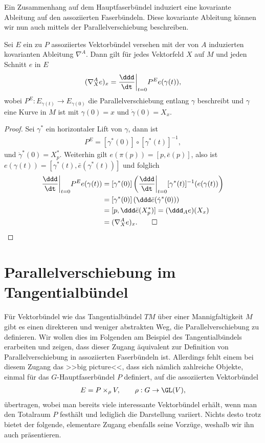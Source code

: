 \documentclass[%
	paper=a5,%
	fleqn,%
	DIV=18,%
	BCOR=0mm,
	fontsize=11pt,
	titlepage=false,%
	bibliography=totoc,
	DIV=18,%
	twoside=true,
	pdftitle=Riemannsche Geometrie,
	pdfauthor=Uwe Semmelmann,
	numbers=noendperiod]%
	{scrbook}
\begin{document}
Ein Zusammenhang auf dem Hauptfaserbündel induziert eine kovariante Ableitung
auf den assoziierten Faserbündeln. Diese kovariante Ableitung können wir nun
auch mittels der Parallelverschiebung beschreiben.

\begin{prop}
Sei $E$ ein zu $P$ assoziiertes Vektorbündel versehen mit der von $A$ induzierten kovarianten Ableitung $\nabla^A$. 
Dann gilt für jedes
Vektorfeld $X$ auf $M$ und jeden Schnitt $e$ in $E$ 
\begin{align*}
(\nabla_X^A e)_x = \frac{\ddd}{\dt}\bigg|_{t=0} P^E e(\gamma(t)),
\end{align*}
wobei $P^E\colon E_{\gamma(t)}\to E_{\gamma(0)}$ die Parallelverschiebung entlang
$\gamma$ beschreibt und $\gamma$ eine Kurve in $M$ ist mit $\gamma(0) = x$ und
$\dot{\gamma}(0) = X_x$.\fish
\end{prop}

\begin{proof}
Sei $\gamma^*$ ein horizontaler Lift von $\gamma$, dann ist
\begin{align*}
P^E = [\gamma^*(0)]\circ [\gamma^*(t)]^{-1},
\end{align*}
und $\dot{\gamma}^*(0) = X_p^*$. Weiterhin gilt $e(\pi(p)) = [p,\bar{e}(p)]$,
also ist $e(\gamma(t)) = [\gamma^*(t),\bar{e}(\gamma^*(t))]$ und folglich
\begin{align*}
\frac{\ddd}{\dt}\bigg|_{t=0} P^E e(\gamma(t)) &= 
[\gamma^*(0)] \left(\frac{\ddd}{\dt}\bigg|_{t=0}
[\gamma^*(t)]^{-1}(e(\gamma(t)) \right)\\
&= [\gamma^*(0)] \left(
\ddd\bar{e}(\dot{\gamma}^*(0)) \right)\\
&= [p,\ddd \bar{e}(X_p^*)]
= (\ddd_A e)(X_x) \\
&= (\nabla^A_X e)_x.\qed
\end{align*}
\end{proof}


\section{Parallelverschiebung im Tangentialbündel}

Für Vektorbündel wie das Tangentialbündel $TM$ über einer Mannigfaltigkeit $M$
gibt es einen direkteren und weniger abstrakten Weg, die Parallelverschiebung zu
definieren. Wir wollen dies im Folgenden am Beispiel des Tangentialbündels
erarbeiten und zeigen, dass dieser Zugang äquivalent zur Definition von
Parallelverschiebung in assoziierten Faserbündeln ist. Allerdings fehlt einem
bei diesem Zugang das >>big picture<<, dass sich nämlich zahlreiche 
Objekte, einmal für das $G$-Hauptfaserbündel $P$ definiert, auf die assoziierten
Vektorbündel
\begin{align*}
E = P\times_\rho V,\qquad \rho : G\to \GL(V),
\end{align*}
übertragen, wobei man bereits viele interessante Vektorbündel erhält, wenn man
den Totalraum $P$  festhält und lediglich die Darstellung
variiert.
Nichts desto trotz bietet  der folgende, elementare Zugang ebenfalls seine
Vorzüge, weshalb wir ihn auch präsentieren. 
\end{document}
